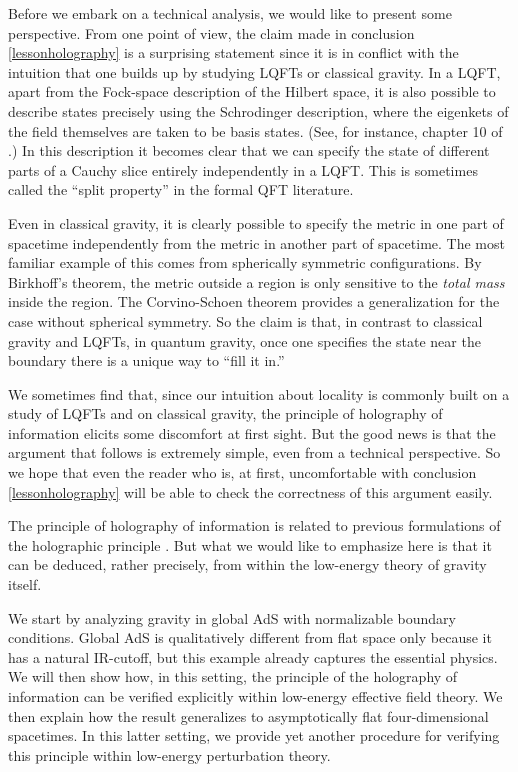 \documentclass[12pt]{article}
\begin{document}
Before we embark on a technical analysis, we would like to present some perspective. From one point of view, the claim made in conclusion \ref{lessonholography} is  a surprising statement since it is in conflict with the intuition that one builds up by studying LQFTs or classical gravity. In a LQFT, apart from the Fock-space description of the Hilbert space, it is also possible to describe states precisely using the Schrodinger description, where the eigenkets of the field themselves are taken to be basis states. (See, for instance, chapter 10 of \cite{hatfield1991quantum}.) In this description it becomes clear that we can specify the state of different parts of a Cauchy slice entirely independently in a LQFT. This is sometimes called the ``split property'' \cite{Haag:1992hx} in the formal QFT literature. 

Even in classical gravity, it is clearly possible to specify the metric in one part of spacetime independently from the metric in another part of spacetime. The most familiar example of this comes from spherically symmetric configurations.  By Birkhoff's theorem, the metric outside a region is only sensitive to the {\em total mass} inside the region. The Corvino-Schoen theorem \cite{Corvino:2003sp} provides a generalization for the case without spherical symmetry. So the claim is that, in contrast to classical gravity and LQFTs, in quantum gravity, once one specifies the state near the boundary there is a unique way to ``fill it in.'' 

We sometimes find that, since our intuition about locality is commonly built on a study of  LQFTs and on classical gravity, the principle of holography of information elicits some discomfort at first sight.
But the good news is that the argument that follows is extremely simple, even from a technical perspective. So we hope that even the reader who is, at first, uncomfortable with conclusion \ref{lessonholography} will be able to check the correctness of this argument easily.

The principle of holography of information is related to previous formulations of the holographic principle \cite{Susskind:1994vu,Bousso:2002ju}. But what we would like to emphasize here is that it can be deduced, rather precisely, from within the low-energy theory of gravity itself.

We start by analyzing gravity in global AdS with normalizable boundary conditions.  Global AdS is qualitatively different from flat space only because it has a natural IR-cutoff, but this example already captures the essential physics. We will then show how, in this setting, the principle of the holography of information can be verified explicitly within low-energy effective field theory. We then explain how the result generalizes to asymptotically flat four-dimensional spacetimes. In this latter setting, we provide yet another procedure for
verifying this principle within low-energy perturbation theory.
\end{document}
